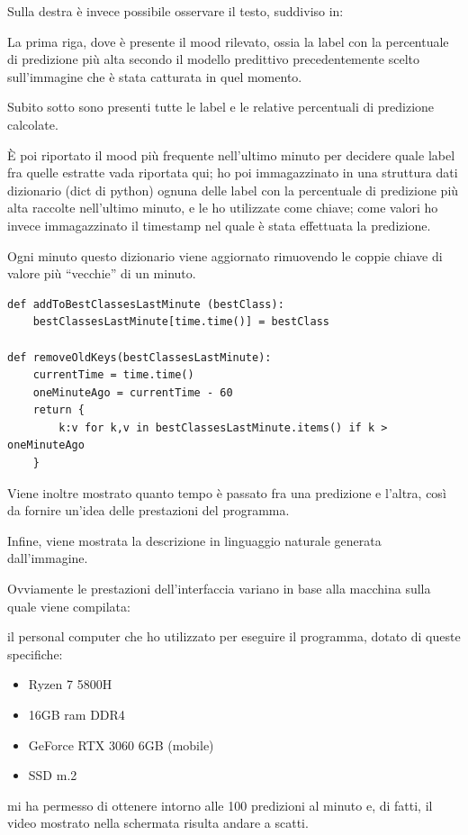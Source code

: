 Sulla destra è invece possibile osservare il testo, suddiviso in:

La prima riga, dove è presente il mood rilevato, ossia la label con la percentuale di predizione più alta secondo il modello predittivo precedentemente scelto sull’immagine che è stata catturata in quel momento.

Subito sotto sono presenti tutte le label e le relative percentuali di predizione calcolate.

È poi riportato il mood più frequente nell’ultimo minuto per decidere quale label fra quelle estratte vada riportata qui; ho poi immagazzinato in una struttura dati dizionario (dict di python) ognuna delle label con la percentuale di predizione più alta raccolte nell’ultimo minuto, e le ho utilizzate come chiave; come valori ho invece immagazzinato il timestamp nel quale è stata effettuata la predizione.

Ogni minuto questo dizionario viene aggiornato rimuovendo le coppie chiave di valore più “vecchie” di un minuto. 
\begin{verbatim}
def addToBestClassesLastMinute (bestClass):
    bestClassesLastMinute[time.time()] = bestClass

def removeOldKeys(bestClassesLastMinute):
    currentTime = time.time()
    oneMinuteAgo = currentTime - 60
    return {
        k:v for k,v in bestClassesLastMinute.items() if k > oneMinuteAgo
    }
\end{verbatim}
Viene inoltre mostrato quanto tempo è passato fra una predizione e l’altra, così da fornire un’idea delle prestazioni del programma.

Infine, viene mostrata la descrizione in linguaggio naturale generata dall'immagine.

Ovviamente le prestazioni dell’interfaccia variano in base alla macchina sulla quale viene compilata:

il personal computer che ho utilizzato per eseguire il programma, dotato di queste specifiche:
\begin{itemize}
    \item Ryzen 7 5800H
    \item 16GB ram DDR4
    \item GeForce RTX 3060 6GB (mobile)
    \item SSD m.2
\end{itemize}

mi ha permesso di ottenere intorno alle 100 predizioni al minuto e, di fatti, il video mostrato nella schermata risulta andare a scatti.

